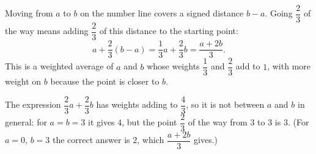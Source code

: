 Moving from $a$ to $b$ on the number line covers a signed distance $b-a$. Going $\dfrac{2}{3}$ of the way means adding $\dfrac{2}{3}$ of this distance to the starting point:
\[
a+\dfrac{2}{3}(b-a)=\dfrac{1}{3}a+\dfrac{2}{3}b=\boxed{\dfrac{a+2b}{3}}.
\]
This is a weighted average of $a$ and $b$ whose weights $\dfrac{1}{3}$ and $\dfrac{2}{3}$ add to $1$, with more weight on $b$ because the point is closer to $b$.

The expression $\dfrac{2}{3}a+\dfrac{2}{3}b$ has weights adding to $\dfrac{4}{3}$, so it is not between $a$ and $b$ in general: for $a=b=3$ it gives $4$, but the point $\dfrac{2}{3}$ of the way from $3$ to $3$ is $3$. (For $a=0$, $b=3$ the correct answer is $2$, which $\dfrac{a+2b}{3}$ gives.)
